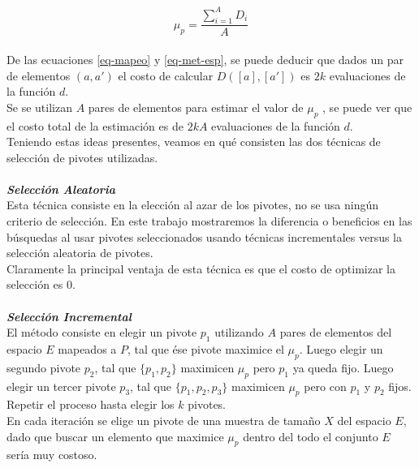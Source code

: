 \begin{equation}
\mu_p = \frac{\sum_{i=1}^A D_i}{A}
\end{equation}
\\

De las ecuaciones \ref{eq-mapeo} y \ref{eq-met-esp}, se puede deducir que dados un par de elementos $(a,a')$ el costo de calcular $D([a],[a'])$ es $2k$ evaluaciones de la funci\'on $d$.\\

Se se utilizan $A$ pares de elementos para estimar el valor de $\mu_p$ , se puede ver que el costo total de la estimaci\'on es de $2kA$ evaluaciones de la funci\'on $d$.\\

Teniendo estas ideas presentes, veamos en qu\'e consisten las dos t\'ecnicas de selecci\'on de pivotes utilizadas.\\
 \\
 
\noindent \textit{\textbf{Selecci\'on Aleatoria}}\\

Esta t\'ecnica consiste en la elecci\'on al azar de los pivotes, no se usa ning\'un criterio de selecci\'on. En este trabajo mostraremos la diferencia o beneficios en las b\'usquedas al usar pivotes  seleccionados usando t\'ecnicas incrementales versus la selecci\'on aleatoria de pivotes.\\

Claramente la principal ventaja de esta t\'ecnica es que el costo de optimizar la selecci\'on es $0$.\\
 \\
 
\noindent \textit{\textbf{Selecci\'on Incremental}}\\

El m\'etodo consiste en elegir un pivote $p_1$ utilizando $A$ pares de elementos del espacio $E$ mapeados a $P$, tal que \'ese pivote maximice el $\mu_p$. Luego elegir un segundo pivote $p_2$, tal que $\{p_1,p_2\}$ maximicen $\mu_p$ pero $p_1$ ya queda fijo. Luego elegir un tercer pivote $p_3$, tal que $\{p_1,p_2,p_3\}$  maximicen $\mu_p$ pero con $p_1$ y  $p_2$ fijos. Repetir el proceso hasta elegir los $k$ pivotes.\\

En cada iteraci\'on se elige un pivote de una muestra de tama\~no $X$ del espacio $E$, dado que buscar un elemento que maximice $\mu_p$ dentro del todo el conjunto $E$  ser\'ia muy costoso.\\


